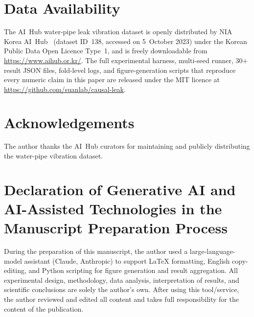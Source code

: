 \documentclass[3p,times,authoryear]{elsarticle}
\theoremstyle{remark}
\begin{document}
\section*{Data Availability}

The AI~Hub water-pipe leak vibration dataset is openly
distributed by NIA Korea AI~Hub~\cite{aihub2022dataset} (dataset
ID~138, accessed on 5~October 2023) under the Korean Public Data
Open Licence Type~1, and is freely downloadable from
\url{https://www.aihub.or.kr/}. The full experimental harness,
multi-seed runner, 30$+$ result JSON files, fold-level logs, and
figure-generation scripts that reproduce every numeric claim in
this paper are released under the MIT licence at
\url{https://github.com/suanlab/causal-leak}.

\section*{Acknowledgements}

The author thanks the AI~Hub curators for maintaining and
publicly distributing the water-pipe vibration dataset.

\section*{Declaration of Generative AI and AI-Assisted
Technologies in the Manuscript Preparation Process}

During the preparation of this manuscript, the author used a
large-language-model assistant (Claude, Anthropic) to support
LaTeX formatting, English copy-editing, and Python scripting
for figure generation and result aggregation. All experimental
design, methodology, data analysis, interpretation of results,
and scientific conclusions are solely the author's own. After
using this tool/service, the author reviewed and edited all
content and takes full responsibility for the content of the
publication.

\FloatBarrier



\end{document}
